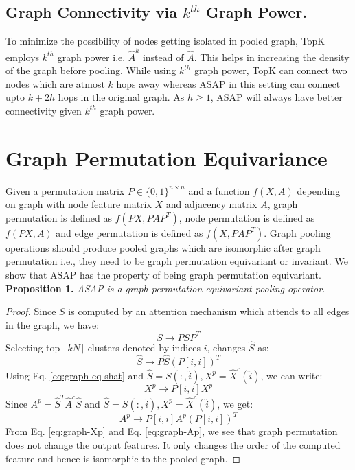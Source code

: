 \documentclass[letterpaper]{article} \usepackage{aaai20}  \usepackage{times}  \usepackage{helvet} \usepackage{courier}  \usepackage[hyphens]{url}  \usepackage{graphicx} \urlstyle{rm} \def\UrlFont{\rm}  \usepackage{graphicx}  \frenchspacing  \setlength{\pdfpagewidth}{8.5in}  \setlength{\pdfpageheight}{11in}
\begin{document}
	
	\subsection{Graph Connectivity via $k^{th}$ Graph Power.}
	\label{kth-power}
	To minimize the possibility of nodes getting isolated in pooled graph, TopK employs $k^{th}$ graph power i.e. $\hat{A}^{k}$ instead of $\hat{A}$. This helps in increasing the density of the graph before pooling. While using $k^{th}$ graph power, TopK can connect two nodes which are atmost $k$ hops away whereas ASAP in this setting can connect upto $k+2h$ hops in the original graph.  As $h\geq1$, ASAP will always have better connectivity given $k^{th}$ graph power.
	
	
	\section{Graph Permutation Equivariance}
	\label{ssec:perm-eq-proof}
	
	Given a permutation matrix $P \in \{0, 1\}^{n \times n}$ and a function $f(X, A)$ depending on graph with node feature matrix $X$ and adjacency matrix $A$, graph permutation is defined as $f(PX, PAP^{T})$, node permutation is defined as $f(PX, A)$ and edge permutation is defined as $f(X, PAP^{T})$.
	Graph pooling operations should produce pooled graphs which are isomorphic after graph permutation i.e., they need to be graph permutation equivariant or invariant. We show that ASAP has the property of being graph permutation equivariant.\\
	
\textbf{Proposition 1.}
	\textit{ASAP is a graph permutation equivariant pooling operator.}
	\begin{proof}
		Since $S$ is computed by an attention mechanism which attends to all edges in the graph, we have:
		\begin{equation}
		\label{eq:graph-eq-S}
		S \rightarrow PSP^{T}
		\end{equation}
		Selecting top $\lceil kN \rceil$ clusters denoted by indices $i$, changes $\hat{S}$ as:
		\begin{equation}
		\label{eq:graph-eq-shat}
		\hat{S} \rightarrow P\hat{S}(P[i, i])^{T}    
		\end{equation}
		Using Eq. \eqref{eq:graph-eq-shat} and    
		$\hat{S} = S(:, \hat{i}), X^{p} = \hat{X}^{c}(\hat{i})$, we can write:
		\begin{equation}
		\label{eq:graph-Xp}
		X^{p} \rightarrow P[i, i]X^{p}
		\end{equation}
		Since $A^{p} = \hat{S}^{T} \hat{A}^c \hat{S}$ and $\hat{S} = S(:, \hat{i}), X^{p} = \hat{X}^{c}(\hat{i})$, we get:
		\begin{equation}
		\label{eq:graph-Ap}
		A^{p} \rightarrow P[i, i]A^{p}(P[i, i])^{T}
		\end{equation}
		From Eq. \eqref{eq:graph-Xp} and Eq. \eqref{eq:graph-Ap}, we see that graph permutation does not change the output features. It only changes the order of the computed feature and hence is isomorphic to the pooled graph.
	\end{proof}
\end{document}
